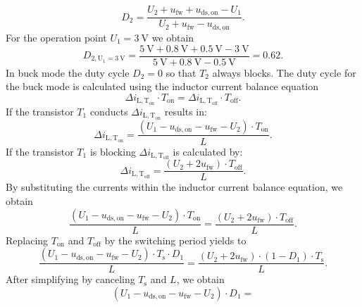 \begin{solutionblock}
	\begin{equation*}
		D_\mathrm{2} = \frac{U_\mathrm{2}+ u_\mathrm{fw} + u_\mathrm{ds,on}-U_\mathrm{1}}{U_\mathrm{2}+ u_\mathrm{fw} - u_\mathrm{ds,on}}.
	\end{equation*}
	For the operation point $U_\mathrm{1}=\SI{3}{\volt}$ we obtain
	\begin{equation*}
		D_\mathrm{2,U_\mathrm{1}=\SI{3}{\volt}}=\frac{\SI{5}{\volt}+ \SI{0.8}{\volt} + \SI{0.5}{\volt}-\SI{3}{\volt}}{\SI{5}{\volt} + \SI{0.8}{\volt} - \SI{0.5}{\volt}}
		= 0.62.
	\end{equation*}
	In buck mode the duty cycle $D_\mathrm{2}=0$ so that $T_\mathrm{2}$ always blocks.
	The duty cycle for the buck mode is calculated using the inductor current balance equation
	\begin{equation*}
		\Delta i_\mathrm{L,T_\mathrm{on}} \cdot T_\mathrm{on}=\Delta i_\mathrm{L,T_\mathrm{off}} \cdot T_\mathrm{off}.
	\end{equation*}
	If the transistor $T_\mathrm{1}$ conducts $\Delta i_\mathrm{L,T_\mathrm{on}}$ results in:
	\begin{equation*}
		\Delta i_\mathrm{L,T_\mathrm{on}}=\frac{(U_\mathrm{1}-u_\mathrm{ds,on} - u_\mathrm{fw} - U_\mathrm{2}) \cdot T_\mathrm{on} }{L}.
	\end{equation*}
	If the transistor $T_\mathrm{1}$ is blocking $\Delta i_\mathrm{L,T_\mathrm{off}}$ is calculated by:
	\begin{equation*}
		\Delta i_\mathrm{L,T_\mathrm{off}}=\frac{(U_\mathrm{2} + 2 u_\mathrm{fw}) \cdot T_\mathrm{off}}{L}.
	\end{equation*}
	By substituting the currents within the inductor current balance equation, we obtain
	\begin{equation*}
		\frac{(U_\mathrm{1}-u_\mathrm{ds,on} - u_\mathrm{fw} - U_\mathrm{2}) \cdot T_\mathrm{on} }{L}=\frac{(U_\mathrm{2} + 2 u_\mathrm{fw}) \cdot T_\mathrm{off}}{L}.
	\end{equation*}
	Replacing $T_\mathrm{on}$ and $T_\mathrm{off}$ by the switching period yields to
	\begin{equation*}
		\frac{(U_\mathrm{1}-u_\mathrm{ds,on} - u_\mathrm{fw} - U_\mathrm{2}) \cdot T_\mathrm{s} \cdot D_\mathrm{1}}{L} =
		\frac{(U_\mathrm{2} + 2 u_\mathrm{fw}) \cdot (1-D_\mathrm{1}) \cdot T_\mathrm{s}}{L}.
	\end{equation*}
	After simplifying by canceling $T_\mathrm{s}$ and $L$, we obtain
	\begin{equation*}
		(U_\mathrm{1}-u_\mathrm{ds,on} - u_\mathrm{fw} - U_\mathrm{2}) \cdot D_\mathrm{1} =

\end{equation*}
\end{solutionblock}
